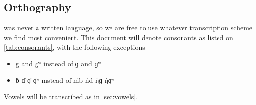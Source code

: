 \subsection{Orthography}
\Langname{} was never a written language, so we are free to use whatever
transcription scheme we find most convenient. This document will denote
consonants as listed on \cref{tab:consonants}, with the following exceptions:
\begin{itemize}
    \item {\ll g} and {\ll gʷ} instead of ɡ and ɡʷ
    \item {\ll ɓ ɗ ɠ ɠʷ} instead of \^mb \^nd \^ŋɡ \^ŋɡʷ
\end{itemize}
Vowels will be transcribed as in \cref{sec:vowels}.

